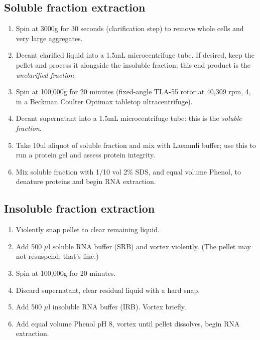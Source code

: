 \documentclass{article}
\newcommand{\mul}{\ensuremath{\mu}l }
\begin{document}
\subsection*{Soluble fraction extraction}
\begin{enumerate}[resume]
  \item Spin at 3000g for 30 seconds (clarification step) to remove whole cells and very large aggregates.
  \item Decant clarified liquid into a 1.5mL microcentrifuge tube. If desired, keep the pellet and process it alongside the insoluble fraction; this end product is the \emph{unclarified fraction}.
  \item Spin at 100,000g for 20 minutes (fixed-angle TLA-55 rotor at 40,309 rpm, 4\celsius, in a Beckman Coulter Optimax tabletop ultracentrifuge).
  \item Decant supernatant into a 1.5mL microcentrifuge tube: this is the \emph{soluble fraction}. 
  \item Take 10ul aliquot of soluble fraction and mix with Laemmli buffer; use this to run a protein gel and assess protein integrity.
  \item Mix soluble fraction with 1/10 vol 2\% SDS, and equal volume Phenol, to denature proteins and begin RNA extraction.
\end{enumerate}

\subsection*{Insoluble fraction extraction}
\begin{enumerate}[resume]
  \item Violently snap pellet to clear remaining liquid.
  \item Add 500 \mul soluble RNA buffer (SRB) and vortex violently. (The pellet may not resuspend; that's fine.)
  \item Spin at 100,000g for 20 minutes.
  \item Discard supernatant, clear residual liquid with a hard snap.
  \item Add 500 \mul insoluble RNA buffer (IRB). Vortex briefly.
 \item Add equal volume Phenol pH 8, vortex until pellet dissolves, begin RNA extraction.
\end{enumerate}
\end{document}
